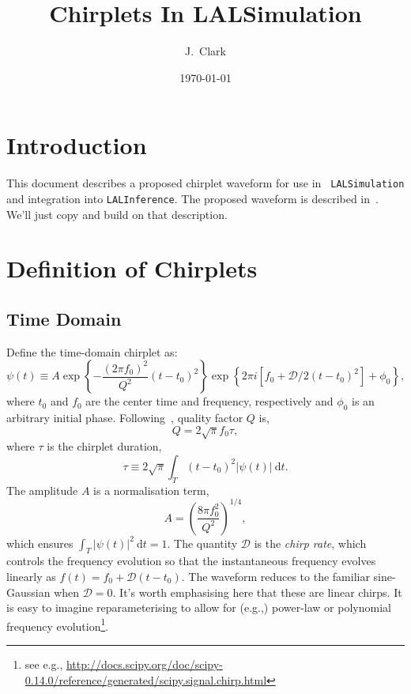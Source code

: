 \documentclass[11pt]{ligovirgodcc}
\begin{document}
\pagestyle{fancy}
\rhead[]{}
\lhead[]{}
%
\title{Chirplets In LALSimulation}

\ligodocdraft{\hfill}

\author{J.~Clark}
%
\date{\today}

%
\maketitle

\tableofcontents
\newpage
\section{Introduction}
This document describes a proposed chirplet waveform for use in {\tt
LALSimulation} and integration into {\tt LALInference}.  The proposed waveform
is described in~\cite{2010CQGra..27s4017C}.  We'll just copy and build on that
description.

\section{Definition of Chirplets}
\subsection{Time Domain}
Define the time-domain chirplet as:
\begin{equation}
\psi(t) \equiv A \exp\left\{-\frac{(2\pi
f_0)^2}{Q^2}(t-t_0)^2\right\} \exp \left\{ 2\pi i [ f_0 +
\mathcal{D}/2(t-t_0)^2 ] + \phi_0 \right\},
\end{equation}
%
where $t_0$ and $f_0$ are the center time and frequency, respectively and
$\phi_0$ is an arbitrary initial phase.  Following~\cite{2010CQGra..27s4017C},
quality factor $Q$ is,
\begin{equation}
Q = 2\sqrt{\pi} f_0 \tau,
\end{equation}
%
where $\tau$ is the chirplet duration,
\begin{equation}
\tau \equiv 2\sqrt{\pi} \int_T (t-t_0)^2 |\psi(t)|~\mathrm{d}t.
\end{equation}
%
The amplitude $A$ is a normalisation term,
\begin{equation}
A = \left(\frac{8\pi f_0^2}{Q^2}\right)^{1/4},
\end{equation}
%
which ensures $\int_T |\psi(t)|^2~\mathrm{d} t = 1$.  The quantity $\mathcal{D}$
is the \emph{chirp rate}, which controls the frequency evolution so that the
instantaneous frequency evolves linearly as $f(t) = f_0 + \mathcal{D}(t-t_0)$.
The waveform reduces to the familiar sine-Gaussian when $\mathcal{D}=0$.  It's
worth emphasising here that these are linear chirps.  It is easy to imagine
reparameterising to allow for (e.g.,) power-law or polynomial frequency
evolution\footnote{see e.g.,
\url{http://docs.scipy.org/doc/scipy-0.14.0/reference/generated/scipy.signal.chirp.html}}.
\end{document}

